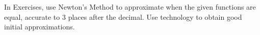 \begin{exerciseset}{In Exercises}{, use Newton's Method to approximate when the given functions are equal, accurate to 3 places after the decimal. Use technology to obtain good initial approximations.}





\end{exerciseset}
